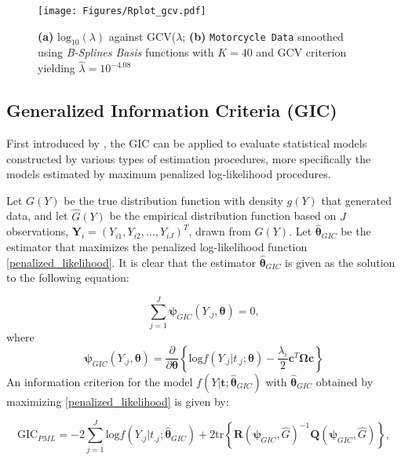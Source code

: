 \begin{figure}[th]
    \texttt{[image: Figures/Rplot\_gcv.pdf]}
  \caption[\textit{Penalized Maximum Likelihood} method using B-Splines]{\textbf{(a)} $\text{log}_{10} (\lambda)$ against GCV($\lambda$; \textbf{(b)} \texttt{Motorcycle Data} smoothed using \textit{B-Splines Basis} functions with $K = 40$ and GCV criterion yielding $\hat{\lambda} = 10^{-4.08}$ }
  \label{fig:gcv_plot}
\end{figure}
\clearpage

\subsection{Generalized Information Criteria (GIC)}\label{GIC}
First introduced by \cite{Konishi1996}, the GIC can be applied to evaluate statistical models constructed by various types of estimation procedures, more specifically the models estimated by maximum penalized log-likelihood procedures.

Let $G(Y)$ be the true distribution function with density $g(Y)$ that generated data, and let $\hat{G}(Y)$ be the empirical distribution function based on $J$ observations, $\bm{Y}_i = (Y_{i1},Y_{i2},\dots,Y_{iJ})^T$, drawn from $G(Y)$.  Let $\bm{\hat{\theta}}_{GIC}$ be the estimator that maximizes the penalized log-likelihood function \eqref{penalized_likelihood}. It is clear that the estimator $\bm{\hat{\theta}}_{GIC}$ is given as the solution to the following equation:

\begin{equation}
\sum_{j=1}^{J} \bm{\psi}_{GIC}(Y_{.j},\bm{\theta}) = 0,
\end{equation} 
where
\begin{equation}
\bm{\psi}_{GIC}(Y_{.j},\bm{\theta}) = \frac{\partial}{\partial \bm{\theta}} \left\{ \text{log}f(Y_{.j}|t_{.j};\bm{\theta})-\frac{\lambda_i}{2} \bm{c}^T \bm{\Omega} \bm{c} \right\}
\end{equation}
An information criterion for the model $f(Y|\bm{t};\bm{\hat{\theta}}_{GIC})$ with $\bm{\hat{\theta}}_{GIC}$ obtained by maximizing \eqref{penalized_likelihood} is given by:

\begin{equation}
\text{GIC}_{PML} = -2\sum_{j=1}^{J}\text{log}f(Y_{.j}|t_{.j};\bm{\hat{\theta}}_{GIC}) + 2\text{tr}\left\{\bm{R}(\bm{\psi}_{GIC},\hat{G})^{-1} \bm{Q}(\bm{\psi}_{GIC},\hat{G})\right\},
\end{equation}

